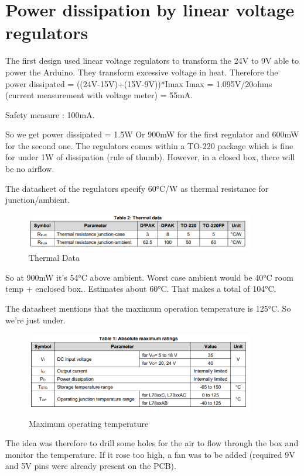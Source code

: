 \documentclass[a4paper]{article}
\begin{document}
\section{Power dissipation by linear voltage regulators}
The first design used linear voltage regulators to transform the 24V to 9V able to power the Arduino.
They transform excessive voltage in heat.
Therefore the power dissipated = ((24V-15V)+(15V-9V))*Imax
Imax =  1.095V/20ohms (current measurement with voltage meter) = 55mA.

Safety measure : 100mA.

So we get power dissipated = 1.5W
Or 900mW for the first regulator and 600mW for the second one.
The regulators comes within a TO-220 package which is fine for under 1W of dissipation (rule of thumb). However, in a closed box, there will be no airflow.

The datasheet of the regulators specify 60°C/W as thermal resistance for junction/ambient.

\begin{figure}[h!]
    \centering
    \includegraphics[width = 10cm]{images/thermalData.png}
    \caption{Thermal Data}
    \label{fig:thermalData}
\end{figure}

So at 900mW it's 54°C above ambient. Worst case ambient would be 40°C room temp + enclosed box.. Estimates about 60°C. That makes a total of 104°C.

The datasheet mentions that the maximum operation temperature is 125°C. So we're just under.


\begin{figure}[h!]
    \centering
    \includegraphics[width = 10cm]{images/thermalData2.png}
    \caption{Maximum operating temperature}
    \label{fig:thermalData2}
\end{figure}

The idea was therefore to drill some holes for the air to flow through the box and monitor the temperature. If it rose too high, a fan was to be added (required 9V and 5V pins were already present on the PCB).
\end{document}
